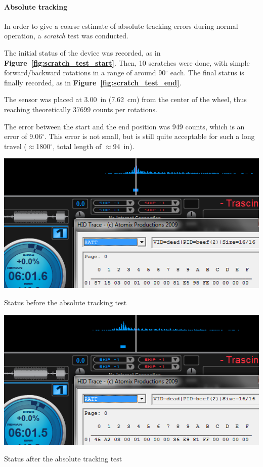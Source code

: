 \documentclass[a4paper,10pt]{article}
\makeatletter
\newenvironment{figurehere}{\def\@captype{figure}\vspace{2ex}}{\vspace{2ex}}
\newcommand{\citef}[1]{\textbf{Figure~\ref{#1}}}
\makeatother
\begin{document}
\begin{multicols}{2}
\paragraph{Absolute tracking}
In order to give a coarse estimate of absolute tracking errors during normal
operation, a \emph{scratch} test was conducted.

The initial status of the device was recorded, as in \citef{fig:scratch_test_start}.
Then, 10 scratches were done, with simple forward/backward rotations in a
range of around 90$^\circ$ each. The final status is finally recorded, as in
\citef{fig:scratch_test_end}.

The sensor was placed at 3.00~in (7.62~cm) from the center of the wheel,
thus reaching theoretically 37699 counts per rotations.

The error between the start and the end position was 949 counts, which is an
error of 9.06$^\circ$. This error is not small, but is still quite acceptable
for such a long travel ($\approx$1800$^\circ$, total length of $\approx$94~in).

\begin{figurehere}
	\centering
	\includegraphics[keepaspectratio=true,width=\columnwidth]{images/scratch_test_start.png}
	\caption{Status before the absolute tracking test}
	\label{fig:scratch_test_start}
\end{figurehere}

\begin{figurehere}
	\centering
	\includegraphics[keepaspectratio=true,width=\columnwidth]{images/scratch_test_end.png}
	\caption{Status after the absolute tracking test}
	\label{fig:scratch_test_end}
\end{figurehere}



\end{multicols}
\end{document}
